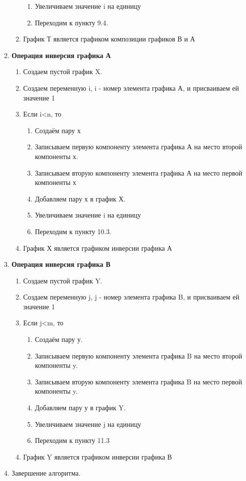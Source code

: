 \documentclass[a4paper,12pt]{extarticle}
\begin{document}
\begin{enumerate}
\begin{enumerate}[label*=\arabic*.]
        \begin{enumerate}[label*=\arabic*.]
            \item Увеличиваем значение i на единицу
            \item Переходим к пункту 9.4.
        \end{enumerate}
        \item График Т является графиком композиции графиков В и А
    \end{enumerate}
  \item \textbf{Операция инверсия графика А}
    \begin{enumerate}[label*=\arabic*.]
        \item Создаем пустой график X.
        \item Создаем переменную i, i - номер элемента графика А, и присваиваем ей значение 1
        \item Если i<n, то
        \begin{enumerate}[label*=\arabic*.]
            \item Создаём пару х
            \item Записываем первую компоненту элемента графика А на место второй компоненты х.
            \item Записываем вторую компоненту элемента графика А на место первой компоненты х
            \item Добавляем пару х в график Х.
            \item Увеличиваем значение i на единицу
            \item Переходим к пункту 10.3.
        \end{enumerate}
        \item График Х является графиком инверсии графика А
    \end{enumerate}
  \item \textbf{Операция инверсия графика В}
    \begin{enumerate}[label*=\arabic*.]
        \item Создаем пустой график Y.
        \item Создаем переменную j, j - номер элемента графика B, и присваиваем ей значение 1
        \item Если j<m, то
        \begin{enumerate}[label*=\arabic*.]
            \item Создаём пару у.
            \item Записываем первую компоненту элемента графика B на место второй компоненты y.
            \item Записываем вторую компоненту элемента графика B на место первой компоненты y.
            \item Добавляем пару у в график Y.
            \item Увеличиваем значение j на единицу
            \item Переходим к пункту 11.3
        \end{enumerate}
        \item График Y является графиком инверсии графика В
    \end{enumerate}
  \item Завершение алгоритма.
\end{enumerate}
\end{document}
